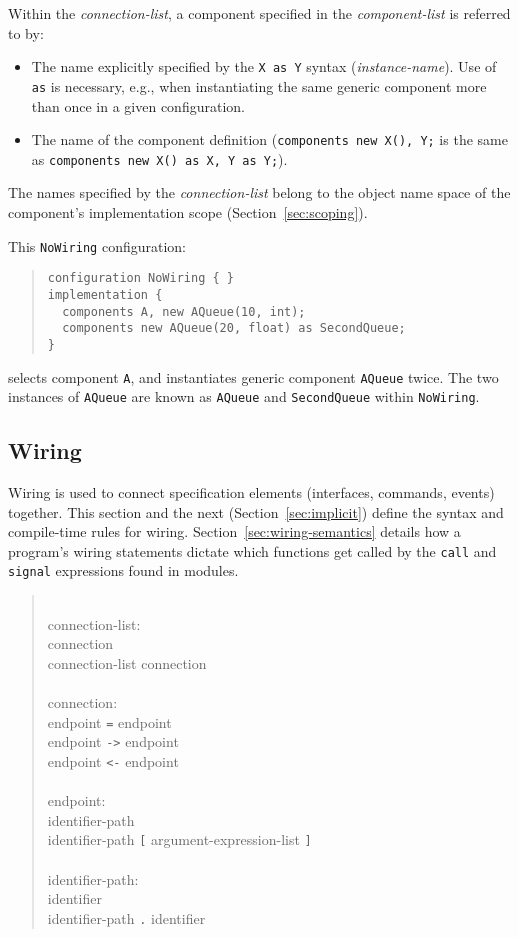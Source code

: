 \documentclass[11pt,letterpaper]{article}
\newcommand{\kw}[1]{{\tt #1}}
\newcommand{\code}[1]{{\tt #1}}
\newcommand{\grammarshift}{\vspace*{-.7cm}}
\newcommand{\grammarindent}{\hspace*{2cm}\= \\ \kill}
\begin{document}
Within the \emph{connection-list}, a component specified in the 
\emph{component-list} is referred to by:
\begin{itemize}
\item The name explicitly specified by the \code{X as Y} syntax
(\emph{instance-name}). Use of \kw{as} is necessary, e.g., when
instantiating the same generic component more than once in a given
configuration.
\item The name of the component definition (\code{components new X(), Y;} is
the same as \code{components new X() as X, Y as Y;}).
\end{itemize}
The names specified by the \emph{connection-list} belong to the object name
space of the component's implementation scope (Section~\ref{sec:scoping}).

This \code{NoWiring} configuration:
\begin{quote}
\begin{verbatim}
configuration NoWiring { }
implementation {
  components A, new AQueue(10, int);
  components new AQueue(20, float) as SecondQueue;
}
\end{verbatim}
\end{quote}
selects component \code{A}, and instantiates generic component
\code{AQueue} twice. The two instances of \code{AQueue} are known as
\code{AQueue} and \code{SecondQueue} within \code{NoWiring}.

\subsection{Wiring}
\label{sec:wiring}

Wiring is used to connect specification elements (interfaces, commands,
events) together. This section and the next (Section~\ref{sec:implicit})
define the syntax and compile-time rules for
wiring. Section~\ref{sec:wiring-semantics} details how a program's wiring
statements dictate which functions get called by the \kw{call} and
\kw{signal} expressions found in modules. 
\begin{quote} \grammarshift \em \begin{tabbing}
\grammarindent
connection-list:\\
\>	connection\\
\>	connection-list connection\\
\\
connection:\\
\>	endpoint \kw{=} endpoint\\
\>	endpoint \kw{->} endpoint\\
\>	endpoint \kw{<-} endpoint\\
\\
endpoint:\\
\>	identifier-path \\
\>	identifier-path \kw{[} argument-expression-list \kw{]}\\
\\
identifier-path:\\
\>	identifier\\
\>	identifier-path \kw{.} identifier\\
\end{tabbing} \end{quote}
\end{document}
